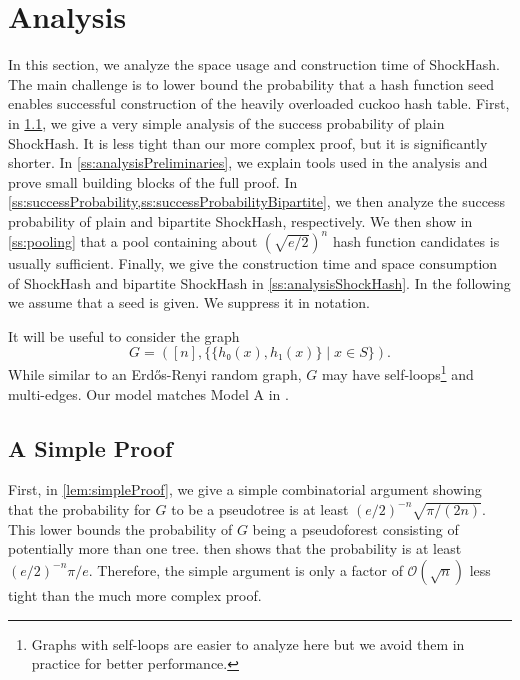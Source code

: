 \documentclass[a4paper,USenglish,cleveref]{lipics-v2021}
\newcommand{\Oh}{\mathcal{O}}
\begin{document}
\section{Analysis}\label{s:analysis}
In this section, we analyze the space usage and construction time of ShockHash.
The main challenge is to lower bound the probability that a hash function seed enables successful construction of the heavily overloaded cuckoo hash table.
First, in \cref{ss:simpleProof}, we give a very simple analysis of the success probability of plain ShockHash.
It is less tight than our more complex proof, but it is significantly shorter.
In \cref{ss:analysisPreliminaries}, we explain tools used in the analysis and prove small building blocks of the full proof.
In \cref{ss:successProbability,ss:successProbabilityBipartite}, we then analyze the success probability of plain and bipartite ShockHash, respectively.
We then show in \cref{ss:pooling} that a pool containing about $(\sqrt{e/2})^{n}$ hash function candidates is usually sufficient.
Finally, we give the construction time and space consumption of ShockHash and bipartite ShockHash in \cref{ss:analysisShockHash}.
In the following we assume that a seed is given.
We suppress it in notation.

It will be useful to consider the graph
\[
G = ([n], \{\{h₀(x),h₁(x)\} \mid x ∈ S\}).
\]
While similar to an Erdős-Renyi random graph, $G$ may have self-loops\footnote{Graphs with self-loops are easier to analyze here but we avoid them in practice for better performance.} and multi-edges.
Our model matches Model A in \cite{frieze2016introduction}.

\subsection{A Simple Proof}\label{ss:simpleProof}
First, in \cref{lem:simpleProof}, we give a simple combinatorial argument showing that the probability for $G$ to be a pseudotree is at least $(e/2)^{-n}\sqrt{\pi/(2n)}$.
This lower bounds the probability of $G$ being a pseudoforest consisting of potentially more than one tree.
 then shows that the probability is at least $(e/2)^{-n} \pi/e$.
Therefore, the simple argument is only a factor of $\Oh(\sqrt{n})$ less tight than the much more complex proof.
\end{document}
